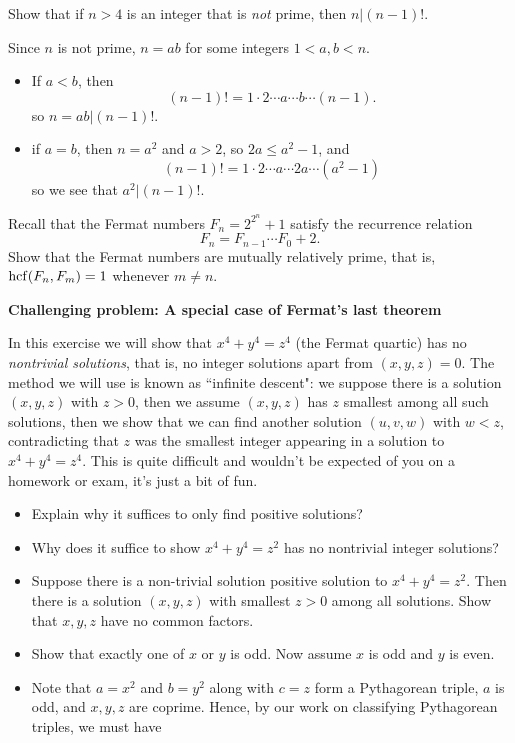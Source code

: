 \documentclass[11pt,dvipsnames]{book}
\def\hcf{{\rm hcf}}
\numberwithin{equation}{section} %
\numberwithin{figure}{section} %
\numberwithin{table}{section} %
\begin{document}
%
\begin{exercise} Show that if $n> 4$ is an integer that is {\it not} prime, then $n|(n-1)!$.

\begin{solution}

Since $n$ is not prime, $n=ab$ for some integers $1<a,b<n$. 
\begin{itemize}[(a)]
\item If $a<b$, then
\[
(n-1)!=1\cdot 2 \cdots a\cdots b\cdots (n-1).
\]
so $n=ab|(n-1)!$.
\item if $a=b$, then $n=a^2$ and $a>2$, so $2a\leq a^2-1$, and 
\[
(n-1)!=1\cdot 2 \cdots a\cdots 2a\cdots (a^2-1)
\]
so we see that $a^2|(n-1)!$. 
\end{itemize}
\end{solution}
%


\begin{exercise} Recall that the Fermat numbers $F_{n}=2^{2^{n}}+1$ satisfy the recurrence relation
\[
F_{n} = F_{n-1}\cdots F_{0}+2.
\]
Show that the Fermat numbers are mutually relatively prime, that is, $\hcf(F_{n},F_{m})=1$ whenever $m\neq n$. 








\end{exercise}




{\bf Challenging problem: A special case of Fermat's last theorem}



\begin{exercise}  In this exercise we will show that $x^4 + y^4 = z^4$ (the Fermat quartic) has no {\it nontrivial solutions}, that is, no integer solutions apart from $(x,y,z)=0$. The method we will use is known as ``infinite descent": we suppose there is a solution $(x,y,z)$ with $z>0$, then we assume $(x,y,z)$ has $z$ smallest among all such solutions, then we show that we can find another solution $(u,v,w)$ with $w<z$, contradicting that $z$ was the smallest integer appearing in a solution to $x^4+y^4=z^4$. This is quite difficult and wouldn't be expected of you on a homework or exam, it's just a bit of fun.
\begin{itemize}
\item Explain why it suffices to only find positive solutions?
\item Why does it suffice to show $x^4+y^4=z^2$ has no nontrivial integer solutions?
\item Suppose there is a non-trivial solution positive solution to  $x^4 + y^4 = z^2$. Then there is a solution $(x,y,z)$ with smallest $z>0$ among all solutions. Show that $x,y,z$ have no common factors. 
\item Show that exactly one of $x$ or $y$ is odd. Now assume $x$ is odd and $y$ is even. 
\item Note that $a=x^2$ and $b=y^2$ along with $c=z$ form a Pythagorean triple, $a$ is odd, and $x,y,z$ are coprime.  Hence, by our work on classifying Pythagorean triples, we must have 


\end{itemize}
\end{exercise}
\end{exercise}
\end{document}

